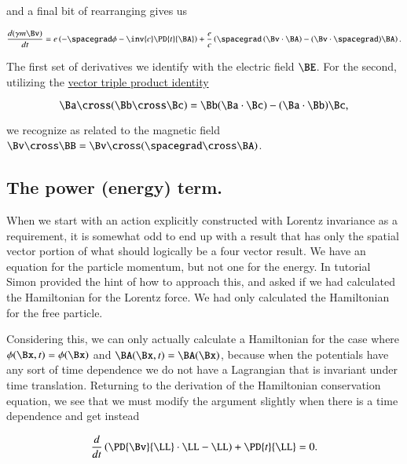 and a final bit of rearranging gives us

\begin{equation}\label{eqn:lorentzForceHamiltonian:120}
\frac{d(\gamma m \Bv)}{dt} =
e \left( -\spacegrad \phi - \inv{c} \PD{t}{\BA}
\right)
+ \frac{e}{c} \left( 
\spacegrad \left( \Bv \cdot \BA \right) - (\Bv \cdot \spacegrad) \BA
\right).
\end{equation}

The first set of derivatives we identify with the electric field $\BE$.  For the second, utilizing the \href{http://en.wikipedia.org/wiki/Triple_product#Vector_triple_product}{vector triple product identity} \citep{wiki:tripleProduct}

\begin{equation}\label{eqn:lorentzForceHamiltonian:140}
\Ba \cross (\Bb \cross \Bc) = \Bb (\Ba \cdot \Bc) - (\Ba \cdot \Bb) \Bc,
\end{equation}

we recognize as related to the magnetic field $\Bv \cross \BB = \Bv \cross (\spacegrad \cross \BA)$.

\subsection{The power (energy) term.}

When we start with an action explicitly constructed with Lorentz invariance as a requirement, it is somewhat odd to end up with a result that has only the spatial vector portion of what should logically be a four vector result.  We have an equation for the particle momentum, but not one for the energy.  In tutorial Simon provided the hint of how to approach this, and asked if we had calculated the Hamiltonian for the Lorentz force.   We had only calculated the Hamiltonian for the free particle.

Considering this, we can only actually calculate a Hamiltonian for the case where $\phi(\Bx, t) = \phi(\Bx)$ and $\BA(\Bx, t) = \BA(\Bx)$, because when the potentials have any sort of time dependence we do not have a Lagrangian that is invariant under time translation.  Returning to the derivation of the Hamiltonian conservation equation, we see that we must modify the argument slightly when there is a time dependence and get instead

\begin{equation}\label{eqn:lorentzForceHamiltonian:160}
\frac{d}{dt} \left( \PD{\Bv}{\LL} \cdot \LL - \LL \right) + \PD{t}{\LL} = 0.
\end{equation}


